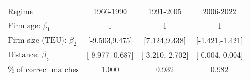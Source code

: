
\begin{tabular}[t]{lccc}
\toprule
Regime & 1966-1990 & 1991-2005 & 2006-2022\\
Firm age: $\beta_1$ & 1 & 1 & 1\\
Firm size (TEU): $\beta_2$ & {}[-9.503,9.475] & {}[7.124,9.338] & {}[-1.421,-1.421]\\
Distance: $\beta_3$ & {}[-9.977,-0.687] & {}[-3.210,-2.702] & {}[-0.004,-0.004]\\
\% of correct matches & 1.000 & 0.932 & 0.982\\
\bottomrule
\end{tabular}

